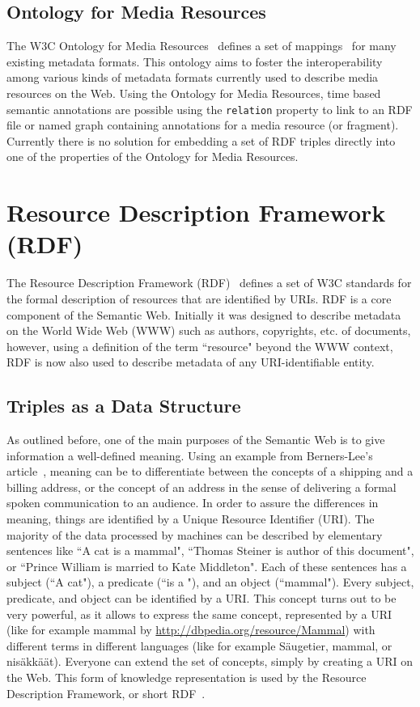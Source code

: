 \documentclass[12pt]{article}
\begin{document}
\subsection{Ontology for Media Resources}
The W3C Ontology for Media Resources~\cite{mediaontology} defines a set of mappings~\cite{mappingtable} for many existing metadata formats. This ontology aims to foster the interoperability among various kinds of metadata formats currently used to describe media resources on the Web. Using the Ontology for Media Resources, time based semantic annotations are possible using the \texttt{relation} property to link to an RDF file or named graph containing annotations for a media resource (or fragment). Currently there is no solution for embedding a set of RDF triples directly into one of the properties of the Ontology for Media Resources.

\section{Resource Description Framework (RDF)}\label{sec:rdf}
The Resource Description Framework (RDF)~\cite{RDF} defines a set of W3C standards for the formal description of resources that are identified by URIs. RDF is a core component of the Semantic Web. Initially it was designed to describe metadata on the World Wide Web (WWW) such as authors, copyrights, etc. of documents, however, using a definition of the term ``resource" beyond the WWW context, RDF is now also used to describe metadata of any URI-identifiable entity.

\subsection{Triples as a Data Structure}
As outlined before, one of the main purposes of the Semantic Web is to give information a well-defined meaning. Using an example from Berners-Lee's article~\cite{berners-lee_et_al_2001}, meaning can be to differentiate between the concepts of a shipping and a billing address, or the concept of an address in the sense of delivering a formal spoken communication to an audience. In order to assure the differences in meaning, things are identified by a Unique Resource Identifier (URI). The majority of the data processed by machines can be described by elementary sentences like ``A cat is a mammal", ``Thomas Steiner is author of this document", or ``Prince William is married to Kate Middleton". Each of these sentences has a subject (``A cat"), a predicate (``is a "), and an object (``mammal"). Every subject, predicate, and object can be identified by a URI. This concept turns out to be very powerful, as it allows to express the same concept, represented by a URI (like for example mammal by \url{http://dbpedia.org/resource/Mammal}) with different terms in different languages (like for example Säugetier, mammal, or nisäkkäät). Everyone can extend the set of concepts, simply by creating a URI on the Web. This form of knowledge representation is used by the Resource Description Framework, or short RDF~\cite{RDF}.
\end{document}
